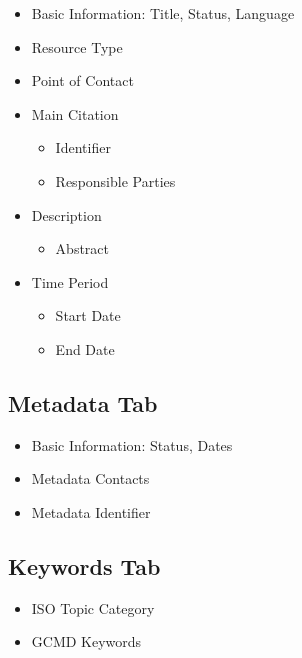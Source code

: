 \documentclass[
]{book}
\providecommand{\tightlist}{%
  \setlength{\itemsep}{0pt}\setlength{\parskip}{0pt}}
\begin{document}
\begin{itemize}
\tightlist
\item
  Basic Information: Title, Status, Language
\item
  Resource Type
\item
  Point of Contact
\item
  Main Citation

  \begin{itemize}
  \tightlist
  \item
    Identifier
  \item
    Responsible Parties
  \end{itemize}
\item
  Description

  \begin{itemize}
  \tightlist
  \item
    Abstract
  \end{itemize}
\item
  Time Period

  \begin{itemize}
  \tightlist
  \item
    Start Date
  \item
    End Date
  \end{itemize}
\end{itemize}

\hypertarget{metadata-tab}{%
\subsection*{Metadata Tab}\label{metadata-tab}}

\begin{itemize}
\tightlist
\item
  Basic Information: Status, Dates
\item
  Metadata Contacts
\item
  Metadata Identifier
\end{itemize}

\hypertarget{keywords-tab}{%
\subsection*{Keywords Tab}\label{keywords-tab}}

\begin{itemize}
\tightlist
\item
  ISO Topic Category
\item
  GCMD Keywords
\end{itemize}
\end{document}
